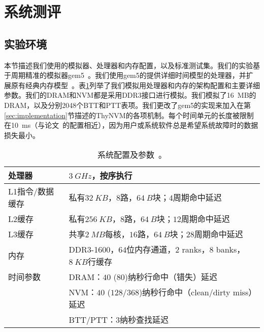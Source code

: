 \section{系统测评}
\label{sec:thnvm-eval}

\subsection{实验环境}

本节描述我们使用的模拟器、处理器和内存配置，以及标准测试集。我们的实验基于周期精准的模拟器gem5~\cite{Binkert:2011:GS:2024716.2024718}。我们使用gem5的提供详细时间模型的处理器，并扩展原有经典内存模型~\cite{6844484}。表\ref{table:config}列举了我们模拟用处理器和内存的架构配置和主要详细参数。我们的DRAM和NVM都是采用DDR3接口进行模拟。我们模拟了16~MB的DRAM，以及分别2048个BTT和PTT表项。我们更改了gem5的实现来加入在第\ref{sec:implementation}节描述的ThyNVM的各项机制。每个时间单元的长度被限制在10~ms（与论文~\cite{1003567, 1003568}的配置相近），因为用户或系统软件总是希望系统故障时的数据损失最小。 

\begin{table}[!h]
\centering
\caption{系统配置及参数~\cite{Lee:2009:APC:1555754.1555758}。}
\label{table:config}
\begin{tabular}{l|l}
\toprule[1.5pt]
处理器 & $3~GHz$，按序执行 \\
\hline
L1指令/数据缓存 & 私有$32~KB$，$8$路，$64~B$块；$4$周期命中延迟 \\
L2缓存 & 私有$256~KB$，$8$路，$64~B$块；$12$周期命中延迟 \\
L3缓存 & 共享$2~MB$每核，$16$路，$64~B$块；$28$周期命中延迟 \\
\hline
内存 & DDR3-1600，$64$位内存通道，$2$ ranks，$8$ banks，$8~KB$行缓存 \\
时间参数 & DRAM：$40$ ($80$)纳秒行命中（错失）延迟 \\
               & NVM：$40$ ($128$/$368$)纳秒行命中（clean/dirty miss）延迟 \\
               & BTT/PTT：$3$纳秒查找延迟 \\
\toprule[1.5pt]
\end{tabular}
\end{table}

